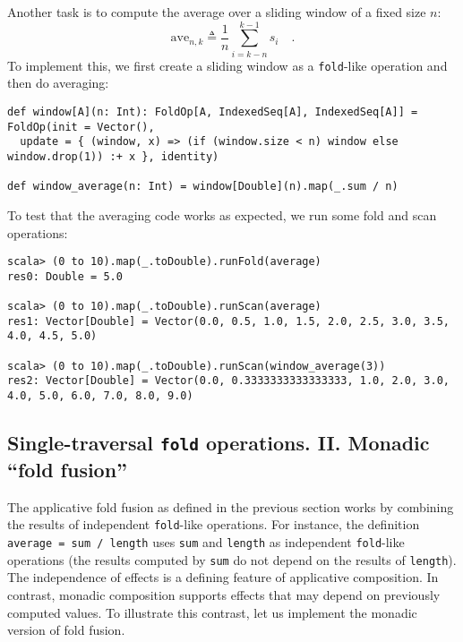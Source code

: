 Another task is to compute the average over a sliding window of a
fixed size $n$:
\[
\text{ave}_{n,k}\triangleq\frac{1}{n}\sum_{i=k-n}^{k-1}s_{i}\quad.
\]
To implement this, we first create a sliding window as a \lstinline!fold!-like
operation and then do averaging:
\begin{lstlisting}
def window[A](n: Int): FoldOp[A, IndexedSeq[A], IndexedSeq[A]] = FoldOp(init = Vector(),
  update = { (window, x) => (if (window.size < n) window else window.drop(1)) :+ x }, identity)

def window_average(n: Int) = window[Double](n).map(_.sum / n)
\end{lstlisting}
To test that the averaging code works as expected, we run some fold
and scan operations:
\begin{lstlisting}
scala> (0 to 10).map(_.toDouble).runFold(average)
res0: Double = 5.0

scala> (0 to 10).map(_.toDouble).runScan(average)
res1: Vector[Double] = Vector(0.0, 0.5, 1.0, 1.5, 2.0, 2.5, 3.0, 3.5, 4.0, 4.5, 5.0)

scala> (0 to 10).map(_.toDouble).runScan(window_average(3))
res2: Vector[Double] = Vector(0.0, 0.3333333333333333, 1.0, 2.0, 3.0, 4.0, 5.0, 6.0, 7.0, 8.0, 9.0)
\end{lstlisting}


\subsection{Single-traversal \texttt{fold} operations. II. Monadic \textquotedblleft fold
fusion\textquotedblright}

The applicative fold fusion as defined in the previous section works
by combining the results of independent \lstinline!fold!-like operations.
For instance, the definition \lstinline!average = sum / length! uses
\lstinline!sum! and \lstinline!length! as independent \lstinline!fold!-like
operations (the results computed by \lstinline!sum! do not depend
on the results of \lstinline!length!). The independence of effects
is a defining feature of applicative composition. In contrast, monadic
composition supports effects that may depend on previously computed
values. To illustrate this contrast, let us implement the monadic
version of fold fusion.

